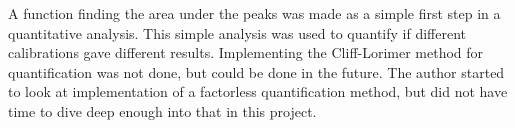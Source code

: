 
A function finding the area under the peaks was made as a simple first step in a quantitative analysis.
This simple analysis was used to quantify if different calibrations gave different results.
Implementing the Cliff-Lorimer method for quantification was not done, but could be done in the future.
The author started to look at implementation of a factorless quantification method, but did not have time to dive deep enough into that in this project.



